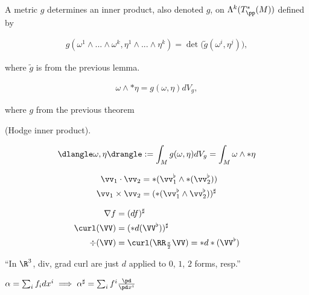 \begin{lemma}
    
    A metric $g$ determines an inner product, also denoted $g$, on $\Lambda^k(T_\pp^*(M))$ defined by 
    
    \begin{align*}
        g(\omega^1 \wedge ... \wedge \omega^k, \eta^1 \wedge ... \wedge \eta^k) = \det \Big( \widetilde{g}(\omega^i, \eta^j) \Big),
    \end{align*}
    
    where $\widetilde{g}$ is from the previous lemma.
\end{lemma}

\begin{theorem}
    \begin{align*}
        \omega \wedge *\eta = g(\omega, \eta) dV_g,
    \end{align*}
    
    where $g$ from the previous theorem
\end{theorem}

\begin{defn}
    (Hodge inner product).

    \begin{align*}
        \dlangle \omega, \eta \drangle := \int_M g(\omega, \eta) dV_g = \int_M \omega \wedge *\eta
    \end{align*}
\end{defn}
    


\begin{theorem}
    \begin{align*}
        \vv_1 \cdot \vv_2 &= *(\vv_1^\flat \wedge *(\vv_2^\flat)) \\
        \vv_1 \times \vv_2 &= (*(\vv_1^\flat \wedge \vv_2^\flat))^\sharp
    \end{align*}

    \begin{align*}
        \nabla f &= (df)^\sharp \\
        \curl(\VV) &= (*d(\VV^\flat))^\sharp \\
        \div(\VV) &= \curl(\RR_{\frac{\pi}{2}} \VV) = *d*(\VV^\flat)
    \end{align*}
\end{theorem}

``In $\R^3$, div, grad curl are just $d$ applied to $0$, $1$, $2$ forms, resp.''

$\alpha = \sum_i f_i dx^i \implies \alpha^\sharp = \sum_i f^i \frac{\pd}{\pd x^i}$

